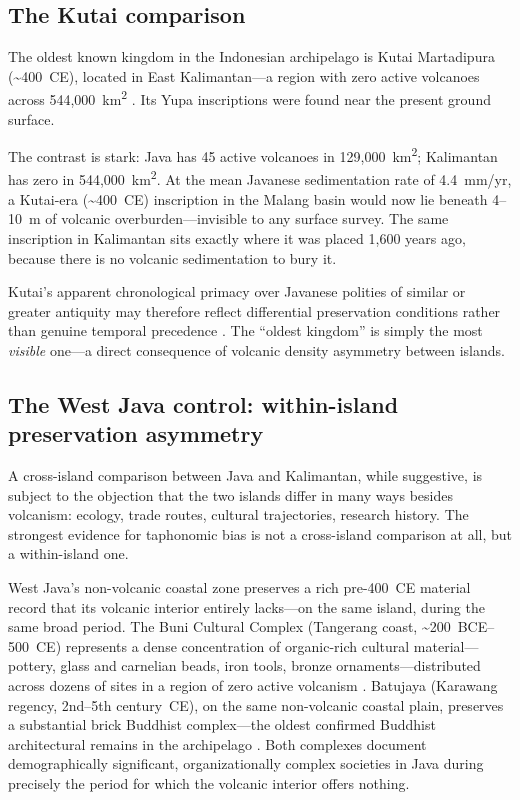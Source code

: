 \documentclass[egqsj, manuscript]{copernicus}
\begin{document}
\subsection{The Kutai comparison}

The oldest known kingdom in the Indonesian archipelago is Kutai Martadipura (\textasciitilde400~CE), located in East Kalimantan---a region with zero active volcanoes across 544,000~km\textsuperscript{2} \citep{vogel1918}. Its Yupa inscriptions were found near the present ground surface.

The contrast is stark: Java has 45 active volcanoes in 129,000~km\textsuperscript{2}; Kalimantan has zero in 544,000~km\textsuperscript{2}. At the mean Javanese sedimentation rate of 4.4~mm/yr, a Kutai-era (\textasciitilde400~CE) inscription in the Malang basin would now lie beneath 4--10~m of volcanic overburden---invisible to any surface survey. The same inscription in Kalimantan sits exactly where it was placed 1,600 years ago, because there is no volcanic sedimentation to bury it.

Kutai's apparent chronological primacy over Javanese polities of similar or greater antiquity may therefore reflect differential preservation conditions rather than genuine temporal precedence \citep{coedes1968,miksic2004}. The ``oldest kingdom'' is simply the most \textit{visible} one---a direct consequence of volcanic density asymmetry between islands.

\subsection{The West Java control: within-island preservation asymmetry}

A cross-island comparison between Java and Kalimantan, while suggestive, is subject to the objection that the two islands differ in many ways besides volcanism: ecology, trade routes, cultural trajectories, research history. The strongest evidence for taphonomic bias is not a cross-island comparison at all, but a within-island one.

West Java's non-volcanic coastal zone preserves a rich pre-400~CE material record that its volcanic interior entirely lacks---on the same island, during the same broad period. The Buni Cultural Complex (Tangerang coast, \textasciitilde200~BCE--500~CE) represents a dense concentration of organic-rich cultural material---pottery, glass and carnelian beads, iron tools, bronze ornaments---distributed across dozens of sites in a region of zero active volcanism \citep{wibisono1994,bellina2014}. Batujaya (Karawang regency, 2nd--5th century~CE), on the same non-volcanic coastal plain, preserves a substantial brick Buddhist complex---the oldest confirmed Buddhist architectural remains in the archipelago \citep{manguin2011}. Both complexes document demographically significant, organizationally complex societies in Java during precisely the period for which the volcanic interior offers nothing.
\end{document}
